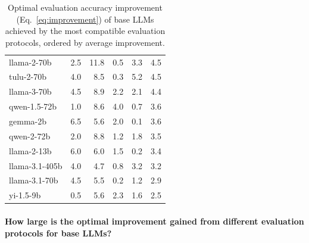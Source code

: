 \documentclass[11pt]{article}
\begin{document}
\begin{table}[t!]
\begin{tabular}{@{}lrrrrr@{}}
 llama-2-70b     & 2.5              & 11.8                 & 0.5           & 3.3             & 4.5          \\
 tulu-2-70b      & 4.0              & 8.5                  & 0.3           & 5.2             & 4.5          \\
 llama-3-70b     & 4.5              & 8.9                  & 2.2           & 2.1             & 4.4          \\
 qwen-1.5-72b    & 1.0              & 8.6                  & 4.0           & 0.7             & 3.6          \\
 gemma-2b        & 6.5              & 5.6                  & 2.0           & 0.1             & 3.6          \\
 qwen-2-72b      & 2.0              & 8.8                  & 1.2           & 1.8             & 3.5          \\
 llama-2-13b     & 6.0              & 6.0                  & 1.5           & 0.2             & 3.4          \\
 llama-3.1-405b  & 4.0              & 4.7                  & 0.8           & 3.2             & 3.2          \\
 llama-3.1-70b   & 4.5              & 5.5                  & 0.2           & 1.2             & 2.9          \\
 yi-1.5-9b       & 0.5              & 5.6                  & 2.3           & 1.6             & 2.5          \\
\bottomrule
\end{tabular}
\addtolength{\tabcolsep}{-1pt} 
\caption{Optimal evaluation accuracy improvement (Eq.~\ref{eq:improvement}) of base LLMs achieved by the most compatible evaluation protocols, ordered by average improvement.
}
\label{tab:models-improvement} 
\end{table}

\paragraph{How large is the optimal improvement gained from different evaluation protocols for base LLMs?}
\end{document}
